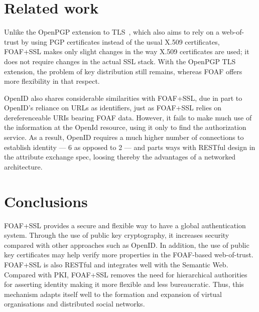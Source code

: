\documentclass{llncs}
\begin{document}
\section{Related work}
\label{sec:other}


Unlike the OpenPGP extension to TLS~\cite{rfc5081}, which also aims to
rely on a web-of-trust by using PGP certificates instead of the usual
X.509 certificates, FOAF+SSL makes only slight changes in the way
X.509 certificates are used; it does not require changes in the actual
SSL stack. With the OpenPGP TLS extension, the problem of key
distribution still remains, whereas FOAF offers more flexibility in
that respect.

OpenID also shares considerable similarities with FOAF+SSL, due in
part to OpenID's reliance on URLs as identifiers, just as FOAF+SSL
relies on dereferenceable URIs bearing FOAF data. However, it fails to
make much use of the information at the OpenId resource, using it only
to find the authorization service. As a result, OpenID requires a much
higher number of connections to establish identity --- 6 as opposed to
2 --- and parts ways with RESTful design in the attribute exchange
spec, loosing thereby the advantages of a networked architecture.

\section{Conclusions}

FOAF+SSL provides a secure and flexible way to have a global
authentication system.  Through the use of public key cryptography, it
increases security compared with other approaches such as OpenID.  In
addition, the use of public key certificates may help verify more
properties in the FOAF-based web-of-trust.  FOAF+SSL is also RESTful
and integrates well with the Semantic Web.  Compared with PKI,
FOAF+SSL removes the need for hierarchical authorities for asserting
identity making it more flexible and less bureaucratic.  Thus, this
mechanism adapts itself well to the formation and expansion of virtual
organisations and distributed social networks.



\end{document}
